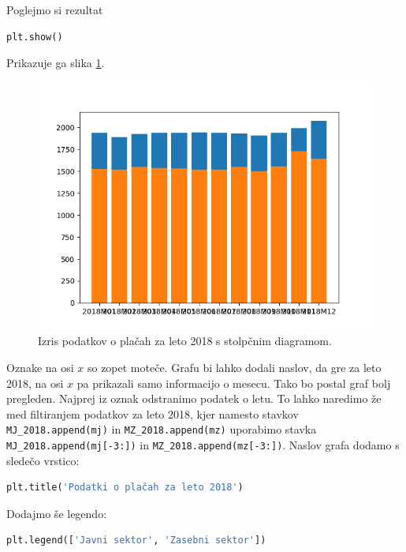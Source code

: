 Poglejmo si rezultat
\begin{lstlisting}[language=Python]
plt.show()
\end{lstlisting}
Prikazuje ga slika \ref{img:plt6}.
\begin{figure}
    \includegraphics[width=\linewidth]{img/plt6.png}
    \caption{Izris podatkov o plačah za leto 2018 s stolpčnim diagramom.}
    \label{img:plt6}
\end{figure}
Oznake na osi $x$ so zopet moteče. Grafu bi lahko dodali naslov, da gre za leto 2018, na osi $x$ pa prikazali samo informacijo o mesecu. Tako bo postal graf bolj pregleden. Najprej iz oznak odstranimo podatek o letu. To lahko naredimo že med filtiranjem podatkov za leto 2018, kjer namesto stavkov \texttt{MJ\_2018.append(mj)} in \texttt{MZ\_2018.append(mz)} uporabimo stavka \texttt{MJ\_2018.append(mj[-3:])} in \texttt{MZ\_2018.append(mz[-3:])}. Naslov grafa dodamo s sledečo vrstico:
\begin{lstlisting}[language=Python, showstringspaces=false]
plt.title('Podatki o plačah za leto 2018')
\end{lstlisting}
Dodajmo še legendo:
\begin{lstlisting}[language=Python, showstringspaces=false]
plt.legend(['Javni sektor', 'Zasebni sektor'])
\end{lstlisting}

